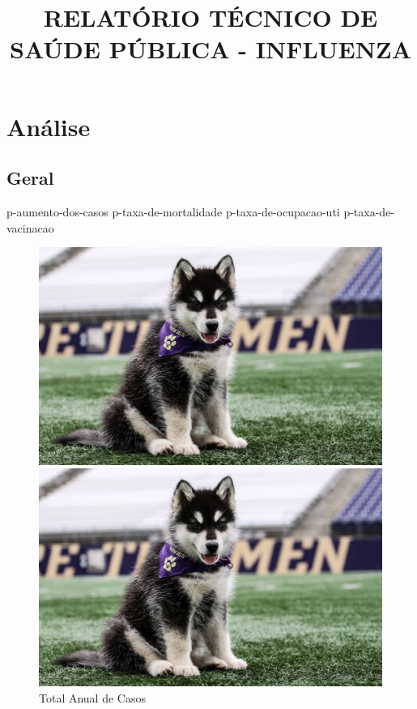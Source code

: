 \documentclass{article}
\title{\textbf{RELATÓRIO TÉCNICO DE SAÚDE PÚBLICA - INFLUENZA}}
\begin{document}
\maketitle

\section{Análise}

\subsection{Geral}
{{p-aumento-dos-casos}}
{{p-taxa-de-mortalidade}}
{{p-taxa-de-ocupacao-uti}}
{{p-taxa-de-vacinacao}}
\begin{figure}[H]
    \centering
    \begin{minipage}{0.45\textwidth}
        \centering
        \includegraphics[width=\textwidth]{dubs.jpg}
        \caption{Total Anual de Casos}
        \label{fig:casos-total-por-ano}
    \end{minipage}
    \hfill
    \begin{minipage}{0.45\textwidth}
        \centering
        \includegraphics[width=\textwidth]{dubs.jpg}

\end{minipage}
\end{figure}
\end{document}
